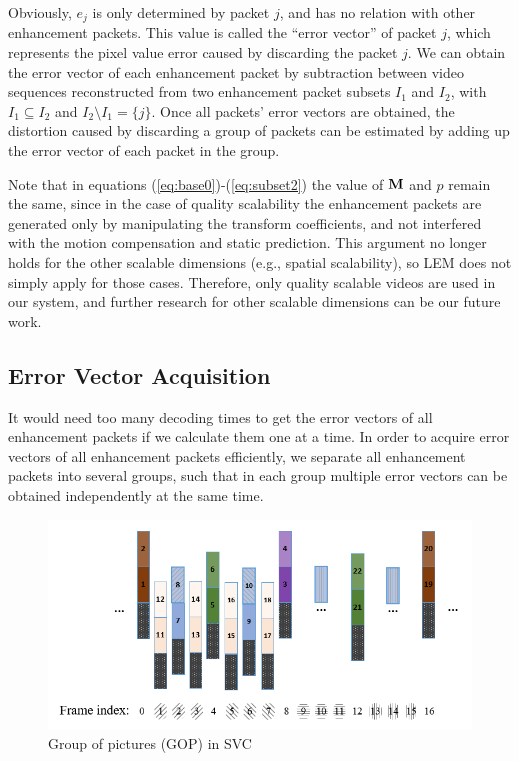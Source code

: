 \documentclass[journal]{IEEEtran}
\begin{document}
Obviously, $e_j$ is only determined by packet $j$, and has no relation with other enhancement packets. This value is called the ``error vector'' of packet $j$, which represents the pixel value error caused by discarding the packet $j$. We can obtain the error vector of each enhancement packet by subtraction between video sequences reconstructed from two enhancement packet subsets $I_1$ and $I_2$, with $I_1 \subseteq I_2$ and $I_2 \setminus I_1 =\{j\} $. Once all packets' error vectors are obtained, the distortion caused by discarding a group of packets can be estimated by adding up the error vector of each packet in the group.

Note that in equations (\ref{eq:base0})-(\ref{eq:subset2}) the value of ${\rm\bf M}$ and $p$ remain the same, since in the case of quality scalability the enhancement packets are generated only by manipulating the transform coefficients, and not interfered with the motion compensation and static prediction. This argument no longer holds for the other scalable dimensions (e.g., spatial scalability), so LEM does not simply apply for those cases. Therefore, only quality scalable videos are used in our system, and further research for other scalable dimensions can be our future work.

\subsection{Error Vector Acquisition}
\label{subsec:error-vector}

It would need too many decoding times to get the error vectors of all enhancement packets if we calculate them one at a time. In order to acquire error vectors of all enhancement packets efficiently, we separate all enhancement packets into several groups, such that in each group multiple error vectors can be obtained independently at the same time.
 
\begin{figure}[h]
\centering
\includegraphics[width = 1.0\linewidth]{GOP-Structure.png}
\caption{Group of pictures (GOP) in SVC \label{fig:GOP_Structure}}
\end{figure}
 
\end{document}
